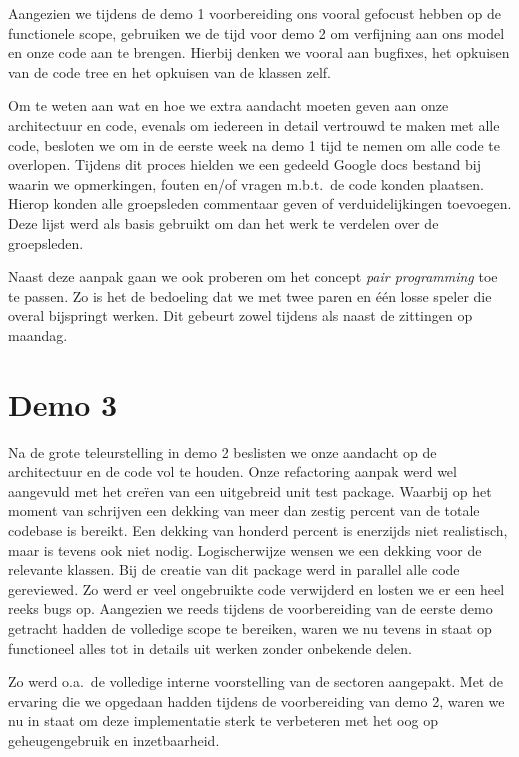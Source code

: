 \documentclass[12pt,a4paper]{report}
\begin{document}
Aangezien we tijdens de demo 1 voorbereiding ons vooral gefocust hebben op de functionele scope, gebruiken we de tijd voor demo 2 om verfijning aan ons model en onze code aan te brengen. Hierbij denken we vooral aan bugfixes, het opkuisen van de code tree en het opkuisen van de klassen zelf.

Om te weten aan wat en hoe we extra aandacht moeten geven aan onze architectuur en code, evenals om iedereen in detail vertrouwd te maken met alle code, besloten we om in de eerste week na demo 1 tijd te nemen om alle code te overlopen. Tijdens dit proces hielden we een gedeeld Google docs bestand bij waarin we opmerkingen, fouten en/of vragen m.b.t.\ de code konden plaatsen. Hierop konden alle groepsleden commentaar geven of verduidelijkingen toevoegen. Deze lijst werd als basis gebruikt om dan het werk te verdelen over de groepsleden.

Naast deze aanpak gaan we ook proberen om het concept \emph{pair programming} toe te passen. Zo is het de bedoeling dat we met twee paren en \'e\'en losse speler die overal bijspringt werken. Dit gebeurt zowel tijdens als naast de zittingen op maandag.

\section{Demo 3}

Na de grote teleurstelling in demo 2 beslisten we onze aandacht op de architectuur en de code vol te houden. Onze refactoring aanpak werd wel aangevuld met het cre\"ren van een uitgebreid unit test package. Waarbij op het moment van schrijven een dekking van meer dan zestig percent van de totale codebase is bereikt. Een dekking van honderd percent is enerzijds niet realistisch, maar is tevens ook niet nodig. Logischerwijze wensen we een dekking voor de relevante klassen. Bij de creatie van dit package werd in parallel alle code gereviewed. Zo werd er veel ongebruikte code verwijderd en losten we er een heel reeks bugs op. Aangezien we reeds tijdens de voorbereiding van de eerste demo getracht hadden de volledige scope te bereiken, waren we nu tevens in staat op functioneel alles tot in details uit werken zonder onbekende delen.

Zo werd o.a.\ de volledige interne voorstelling van de sectoren aangepakt. Met de ervaring die we opgedaan hadden tijdens de voorbereiding van demo 2, waren we nu in staat om deze implementatie sterk te verbeteren met het oog op geheugengebruik en inzetbaarheid.
\end{document}
